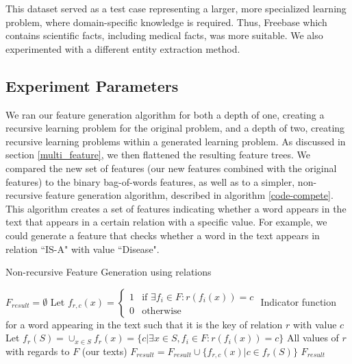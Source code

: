 \documentclass[twoside,11pt]{article}
\theoremstyle{definition}
\begin{document}
\begin{enumerate}
	This dataset served as a test case representing a larger, more specialized learning problem, where domain-specific knowledge is required. Thus, Freebase which contains scientific facts, including medical facts, was more suitable. We also experimented with a different entity extraction method.
\end{enumerate}

\subsection{Experiment Parameters}

We ran our feature generation algorithm for both a depth of one, creating a recursive learning problem for the original problem, and a depth of two, creating recursive learning problems within a generated learning problem. As discussed in section \ref{multi_feature}, we then flattened the resulting feature trees.
We compared the new set of features (our new features combined with the original features) to the binary bag-of-words features, as well as to a simpler, non-recursive feature generation algorithm, described in algorithm \ref{code-compete}. This algorithm creates a set of features indicating whether a word appears in the text that appears in a certain relation with a specific value. For example, we could generate a feature that checks whether a word in the text appears in relation ``IS-A" with value ``Disease". 

\begin{algorithm}[H]
	\caption{Non-recursive Feature Generation using relations}
	\label{code-compete}
	\small
	\begin{algorithmic}
		\State $F_{result}=\emptyset$
		\State  Let $f_{r,c}(x)= \begin{cases} 1 &\mbox{if } \exists f_i\in F :r(f_i(x))=c\\ 
		0 & \mbox{otherwise } \end{cases}$
		\Comment Indicator function for a word appearing in the text such that it is the key of relation $r$ with value $c$
		\State Let $f_r(S)= \cup_{x\in S} f_r(x)=\{c|\exists x\in S,f_i\in F: r(f_i(x))=c\}$
		\Comment All values of $r$ with regards to $F$ (our texts)
		\State  $F_{result}=F_{result}\cup \{f_{r,c}(x)|c\in f_r(S)\}$
		\EndFor
		\State \Return $F_{result}$ 
		\EndFunction
		
	\end{algorithmic}
\end{algorithm}
\end{document}
